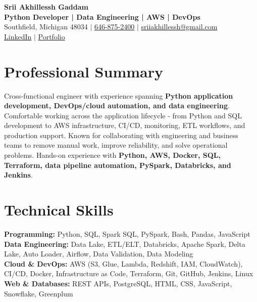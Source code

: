 \documentclass[letterpaper,10pt]{article}
\begin{document}
\fontsize{9.35pt}{10.45pt}\selectfont

\begin{center}
    {\LARGE \textbf{Srii Akhillessh Gaddam}} \\[-1pt]
    \textbf{Python Developer | Data Engineering | AWS | DevOps} \\[2pt]
    Southfield, Michigan 48034 $|$
    \href{tel:6468752400}{646-875-2400} $|$
    \href{mailto:sriiakhillessh@gmail.com}{sriiakhillessh@gmail.com} \\[1pt]
    \href{https://www.linkedin.com/in/srii-akhiilessh-gaddam-b48668191/}{LinkedIn} $|$
    \href{https://sriiakhillesshg.github.io/portfolio/}{Portfolio}
\end{center}
\vspace{-8pt}

\section{Professional Summary}
\small{Cross-functional engineer with experience spanning \textbf{Python application development, DevOps/cloud automation, and data engineering}. Comfortable working across the application lifecycle - from Python and SQL development to AWS infrastructure, CI/CD, monitoring, ETL workflows, and production support. Known for collaborating with engineering and business teams to remove manual work, improve reliability, and solve operational problems. Hands-on experience with \textbf{Python, AWS, Docker, SQL, Terraform, data pipeline automation, PySpark, Databricks, and Jenkins}.}

\section{Technical Skills}
\small{
\textbf{Programming:} Python, SQL, Spark SQL, PySpark, Bash, Pandas, JavaScript \\
\textbf{Data Engineering:} Data Lake, ETL/ELT, Databricks, Apache Spark, Delta Lake, Auto Loader, Airflow, Data Validation, Data Modeling \\
\textbf{Cloud \& DevOps:} AWS (S3, Glue, Lambda, Redshift, IAM, CloudWatch), CI/CD, Docker, Infrastructure as Code, Terraform, Git, GitHub, Jenkins, Linux \\
\textbf{Web \& Databases:} REST APIs, PostgreSQL, HTML, CSS, JavaScript, Snowflake, Greenplum
}
\end{document}
